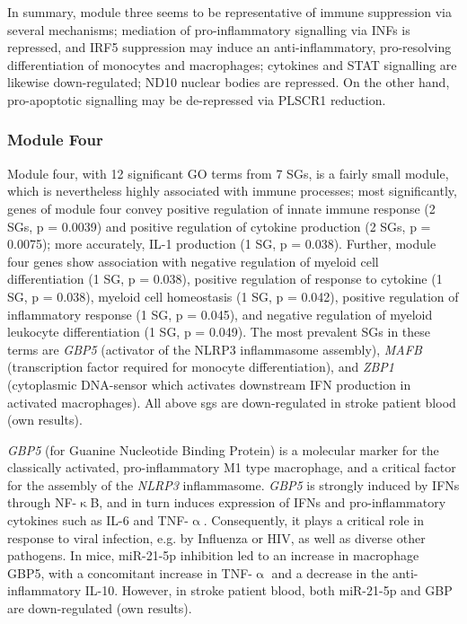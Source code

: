 In summary, module three seems to be representative of immune suppression via several mechanisms; mediation of pro-inflammatory signalling via INFs is repressed, and IRF5 suppression may induce an anti-inflammatory, pro-resolving differentiation of monocytes and macrophages; cytokines and STAT signalling are likewise down-regulated; ND10 nuclear bodies are repressed. On the other hand, pro-apoptotic signalling may be de-repressed via PLSCR1 reduction.

\subsubsection{Module Four}
Module four, with 12 significant GO terms from 7 SGs, is a fairly small module, which is nevertheless highly associated with immune processes; most significantly, genes of module four convey positive regulation of innate immune response (2 SGs, p = 0.0039) and positive regulation of cytokine production (2 SGs, p = 0.0075); more accurately, IL-1 production (1 SG, p = 0.038). Further, module four genes show association with negative regulation of myeloid cell differentiation (1 SG, p = 0.038), positive regulation of response to cytokine (1 SG, p = 0.038), myeloid cell homeostasis (1 SG, p = 0.042), positive regulation of inflammatory response (1 SG, p = 0.045), and negative regulation of myeloid leukocyte differentiation (1 SG, p = 0.049). The most prevalent SGs in these terms are \emph{GBP5} (activator of the NLRP3 inflammasome assembly), \emph{MAFB} (transcription factor required for monocyte differentiation), and \emph{ZBP1} (cytoplasmic DNA-sensor which activates downstream IFN production in activated macrophages). All above \acp{sg} are down-regulated in stroke patient blood (own results).

\emph{GBP5} (for Guanine Nucleotide Binding Protein) is a molecular marker for the classically activated, pro-inflammatory M1 type macrophage,\cite{Fujiwara2016} and a critical factor for the assembly of the \emph{NLRP3} inflammasome.\cite{Shenoy2012} \emph{GBP5} is strongly induced by IFNs through NF-$\upkappa$B, and in turn induces expression of IFNs and pro-inflammatory cytokines such as IL-6 and TNF-$\upalpha$.\cite{Feng2017} Consequently, it plays a critical role in response to viral infection, e.g. by Influenza or HIV, as well as diverse other pathogens.\cite{Feng2017,Krapp2016} In mice, miR-21-5p inhibition led to an increase in macrophage GBP5, with a concomitant increase in TNF-$\upalpha$ and a decrease in the anti-inflammatory IL-10.\cite{Corsetti2018} However, in stroke patient blood, both miR-21-5p and GBP are down-regulated (own results).

